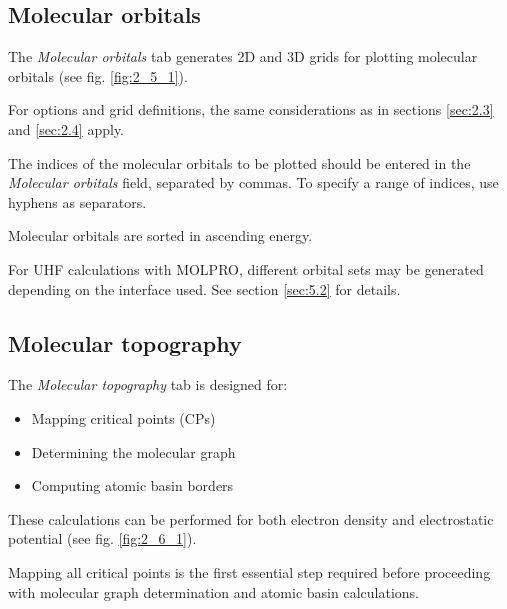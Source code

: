 \documentclass[10pt]{article}
\begin{document}
\subsection{Molecular orbitals \label{sec:2.5}}

The {\it Molecular orbitals} tab generates 2D and 3D grids
for plotting molecular orbitals (see fig. \ref{fig:2_5_1}).

For options and grid definitions, the same considerations as in
sections \ref{sec:2.3} and \ref{sec:2.4} apply.

The indices of the molecular orbitals to be plotted should be entered in the {\it Molecular orbitals} field,
separated by commas. To specify a range of indices, use hyphens as separators.

Molecular orbitals are sorted in ascending energy.

For UHF calculations with MOLPRO, different orbital sets may be generated
depending on the interface used. See section \ref{sec:5.2} for details.


\subsection{Molecular topography \label{sec:2.6}}

The {\it Molecular topography} tab is designed for:

\begin{itemize}
\item Mapping critical points (CPs)
\item Determining the molecular graph
\item Computing atomic basin borders
\end{itemize}

These calculations can be performed for both electron density and electrostatic potential (see fig. \ref{fig:2_6_1}).

Mapping all critical points is the first essential step required
before proceeding with molecular graph determination and atomic basin calculations.

\vspace*{10mm}
\end{document}

